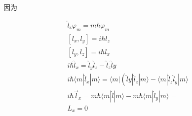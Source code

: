 因为

\begin{align*}
	\hat{l}_{\mathrm{z}}\varphi _m=m\hbar \varphi _m\\
	\left[ l_x,l_y \right] =i\hbar l_z\\
	\left[ l_y,l_z \right] =i\hbar l_x\\
	i\hbar \hat{l}_x=\hat{l}_y\hat{l}_z-\hat{l}_z\hat{l}y\\
	i\hbar \left. \langle m\left| \hat{l}_x \right|m \right. \rangle =\langle m|\left( \hat{l}y\left| \hat{l}_z \right|m \right. \rangle -\left. \langle m\left| \hat{l}_z\hat{l}_y \right|m \right. \rangle\\
	i\hbar \vec{l}_x=m\hbar \langle m|\hat{l}|m\rangle -m\hbar \left. \langle m\left| \hat{l}_y \right|m \right. \rangle =\\
	L_x=0\\
\end{align*}